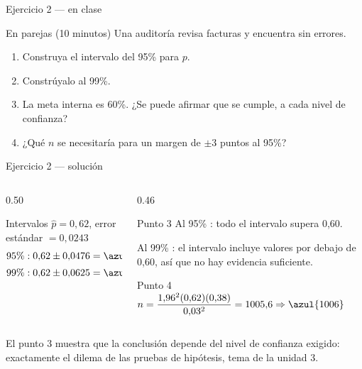 \documentclass[aspectratio=169,10pt]{beamer}
\begin{document}
\begin{frame}{Ejercicio 2 — en clase}
  \begin{alertblock}{En parejas (10 minutos)}
    Una auditoría revisa  facturas y encuentra
     sin errores.

    \vspace{0.25cm}
    \begin{enumerate}
      \item Construya el intervalo del 95\% para $p$.
      \item Constrúyalo al 99\%.
      \item La meta interna es 60\%. ¿Se puede afirmar que se cumple, a cada
            nivel de confianza?
      \item ¿Qué $n$ se necesitaría para un margen de $\pm 3$ puntos al
            95\%?
    \end{enumerate}
  \end{alertblock}
\end{frame}

\begin{frame}{Ejercicio 2 — solución}
  \begin{columns}[T,onlytextwidth]
    \begin{column}{0.50\textwidth}
      \begin{block}{Intervalos}
        \footnotesize
        $\hat p=0{,}62$, \; error estándar $=0{,}0243$
        \begin{align*}
          95\%:\;& 0{,}62\pm 0{,}0476 = \azul{(0{,}5724;\ 0{,}6676)}\\[0.2em]
          99\%:\;& 0{,}62\pm 0{,}0625 = \azul{(0{,}5575;\ 0{,}6825)}
        \end{align*}
      \end{block}
    \end{column}
    \begin{column}{0.46\textwidth}
      \begin{exampleblock}{Punto 3}
        \footnotesize
        Al 95\% : todo el intervalo supera 0{,}60.

        \vspace{0.1cm}
        Al 99\% : el intervalo incluye valores por debajo de
        0{,}60, así que no hay evidencia suficiente.
      \end{exampleblock}
      \begin{alertblock}{Punto 4}
        \footnotesize
        $n=\dfrac{1{,}96^{2}(0{,}62)(0{,}38)}{0{,}03^{2}}=1005{,}6
        \Rightarrow \azul{1006}$
      \end{alertblock}
    \end{column}
  \end{columns}

  \vspace{0.05cm}
  {\scriptsize\color{uniGris} El punto 3 muestra que la conclusión depende del
  nivel de confianza exigido: exactamente el dilema de las pruebas de
  hipótesis, tema de la unidad 3.}
\end{frame}
\end{document}

